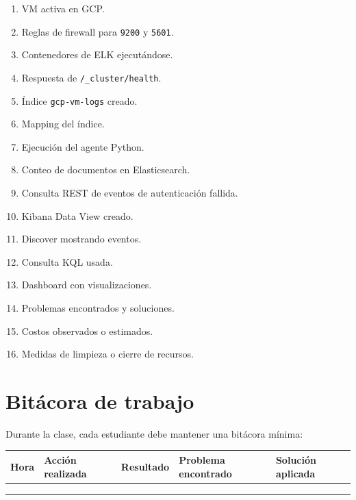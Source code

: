 \documentclass[
  coursetitle={Cómputo Nube y Tecnologías Emergentes},
  coursehours={96},
  coursedate={Verano 2026},
  doctype={Práctica},
  otherlangs={english,french},
  authorname={Lázaro},
  authorsurname={Bustio-Martínez},
  authortitle={PhD},
  role={Profesor Investigador},
  email={lbustio@inaoe.mx},
  phone={5559504000},
  ext={7459},
  institution={Instituto Nacional de Astrofísica, Óptica y Electrónica (INAOE)},
  department={Maestría en Ciencias en Tecnologías de Seguridad},
  address={Luis Enrique Erro 1, Sta. Ma. Tonantzintla, San Andrés Cholula, CP 72840, Puebla, México},
  margin={0.5in}
]{../../lbustio_lecture_notes}
\begin{document}
\begin{enumerate}
    \item VM activa en GCP.
    \item Reglas de firewall para \texttt{9200} y \texttt{5601}.
    \item Contenedores de ELK ejecutándose.
    \item Respuesta de \texttt{/\_cluster/health}.
    \item Índice \texttt{gcp-vm-logs} creado.
    \item Mapping del índice.
    \item Ejecución del agente Python.
    \item Conteo de documentos en Elasticsearch.
    \item Consulta REST de eventos de autenticación fallida.
    \item Kibana Data View creado.
    \item Discover mostrando eventos.
    \item Consulta KQL usada.
    \item Dashboard con visualizaciones.
    \item Problemas encontrados y soluciones.
    \item Costos observados o estimados.
    \item Medidas de limpieza o cierre de recursos.
\end{enumerate}

\section{Bitácora de trabajo}

Durante la clase, cada estudiante debe mantener una bitácora mínima:

\begin{center}
\begin{tabularx}{0.95\textwidth}{|>{\raggedright\arraybackslash}p{}|>{\raggedright\arraybackslash}X|>{\raggedright\arraybackslash}p{}|>{\raggedright\arraybackslash}p{}|>{\raggedright\arraybackslash}p{}|}
\hline
\textbf{Hora} & \textbf{Acción realizada} & \textbf{Resultado} & \textbf{Problema encontrado} & \textbf{Solución aplicada} \\
\hline
 & & & & \\
\hline
 & & & & \\
\hline
 & & & & \\
\hline
\end{tabularx}
\end{center}
\end{document}

